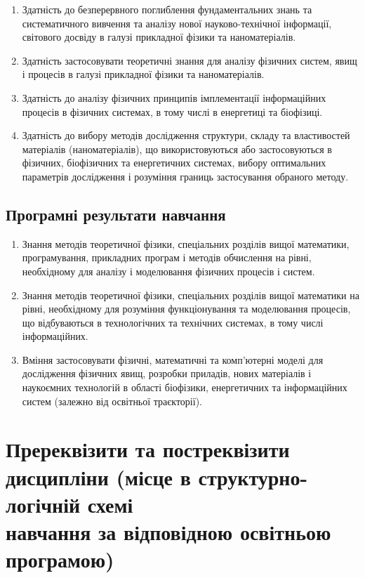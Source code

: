 \documentclass{Syllabus}
\begin{document}
\begin{enumerate}
\item [ФК 2:] Здатність до безперервного поглиблення фундаментальних знань та систематичного вивчення та аналізу нової науково-технічної інформації, світового досвіду в галузі прикладної фізики та наноматеріалів.
\item [ФК 3:] Здатність застосовувати теоретичні знання для аналізу фізичних систем, явищ і процесів в галузі прикладної фізики та наноматеріалів.
\item [ФК 10:] Здатність до аналізу фізичних принципів імплементації інформаційних процесів в фізичних системах, в тому числі в енергетиці та біофізиці.
\item [ФК 11:] Здатність до вибору методів дослідження структури, складу та властивостей матеріалів (наноматеріалів), що використовуються або застосовуються в фізичних, біофізичних та енергетичних системах, вибору оптимальних параметрів дослідження і розуміння границь застосування обраного методу.
\end{enumerate}

\subsection*{Програмні результати навчання}

\begin{enumerate}
    \item [ПРН 2:] Знання методів теоретичної фізики, спеціальних розділів вищої математики, програмування, прикладних програм і методів обчислення на рівні, необхідному для аналізу і моделювання фізичних процесів і систем.
    \item [ПРН 4:] Знання методів теоретичної фізики, спеціальних розділів вищої математики на рівні, необхідному для розуміння функціонування та моделювання процесів, що відбуваються в технологічних та технічних системах, в тому числі інформаційних.
    \item [ПРН 9:] Вміння застосовувати фізичні, математичні та комп'ютерні моделі для дослідження фізичних явищ, розробки приладів, нових матеріалів і наукоємних технологій в області біофізики, енергетичних та інформаційних систем (залежно від освітньої траєкторії).
\end{enumerate}


\section{Пререквізити та постреквізити дисципліни (місце в структурно-логічній схемі\\ навчання за відповідною освітньою програмою)}
\end{document}
